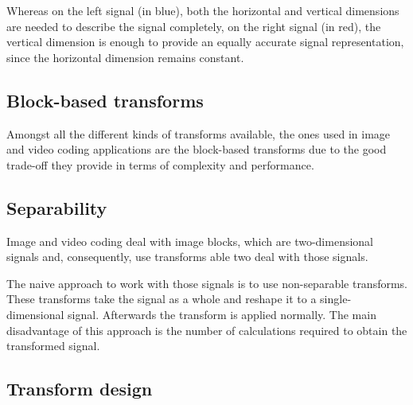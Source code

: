 \documentclass[11pt,a4paper,openright,twoside]{book}
\numberwithin{equation}{section} %
\begin{document}
Whereas on the left signal (in blue), both the horizontal and vertical
dimensions are needed to describe the signal completely, on the right
signal (in red), the vertical dimension is enough to provide an equally
accurate signal representation, since the horizontal dimension remains
constant.

\subsection{Block-based transforms}
\label{sub:block_based_transforms}

Amongst all the different kinds of transforms available, the ones used
in image and video coding applications are the block-based transforms
due to the good trade-off they provide in terms of complexity and
performance.

\subsection{Separability}
\label{sub:separability}

Image and video coding deal with image blocks, which are two-dimensional
signals and, consequently, use transforms able two deal with those
signals.

The naive approach to work with those signals is to use non-separable
transforms.
These transforms take the signal as a whole and reshape it to a
single-dimensional signal.
Afterwards the transform is applied normally.
The main disadvantage of this approach is the number of calculations
required to obtain the transformed signal.

\subsection{Transform design}
\label{sub:transform_design}

\def\A{\mathbf{A}}   %
\def\a{\mathbf{a}}   %
\def\C{\mathbf{C}}   %
\def\E{\text{E}}     %
\def\I{\mathbf{I}}   %
\def\P{\text{P}}     %
\def\R{\mathbf{R}}   %
\def\U{\mathbf{U}}   %
\def\V{\mathbf{V}}   %
\def\X{\mathbf{X}}   %
\def\Y{\mathbf{Y}}   %
\def\arg{\text{arg}} %
\def\c{\mathbf{c}}   %
\def\d{\text{d}}     %
\def\e{\text{e}}     %
\def\GGD{\text{GGD}} %
\def\tr{\text{tr}}   %
\def\x{\mathbf{x}}   %
\def\Lambdab{\contour[3]{black}{$\Lambda$}} %
\end{document}
